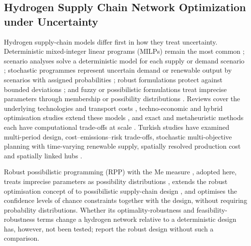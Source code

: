 \documentclass[preprint,12pt,authoryear]{elsarticle}
\begin{document}
\subsection{Hydrogen Supply Chain Network Optimization under Uncertainty}
Hydrogen supply-chain models differ first in how they treat uncertainty. Deterministic mixed-integer linear programs (MILPs) remain the most common \citep{camelo2025milp,yu2025optimization,dergunova2024great}; scenario analyses solve a deterministic model for each supply or demand scenario \citep{ma2025modeling}; stochastic programmes represent uncertain demand or renewable output by scenarios with assigned probabilities \citep{zhou2026collaborative,ozbek2025multi,turkaliozbek2025leveraging}; robust formulations protect against bounded deviations \citep{shao2026robust}; and fuzzy or possibilistic formulations treat imprecise parameters through membership or possibility distributions \citep{ochoarobles2020optimization,fazlikhalaf2020design}. Reviews cover the underlying technologies and transport costs \citep{monteiro2023hydrogen,solomon2024cost}, techno-economic and hybrid optimisation studies extend these models \citep{kim2024techno,park2024optimizing}, and exact and metaheuristic methods each have computational trade-offs at scale \citep{gorji2023challenges}. Turkish studies have examined multi-period design, cost--emissions--risk trade-offs, stochastic multi-objective planning with time-varying renewable supply, spatially resolved production cost and spatially linked hubs \citep{guler2021design,erdogan2023optimization,ozbek2025multi,turkaliozbek2025leveraging,guven2025spatial,gezen2026spatial}.

Robust possibilistic programming (RPP) \citep{pishvaee2012robust} with the Me measure \citep{xu2013approximation}, adopted here, treats imprecise parameters as possibility distributions \citep{dubois1988possibility,inuiguchi2000possibilistic}, extends the robust optimisation concept of \citet{mulvey1995robust} to possibilistic supply-chain design \citep{pishvaee2010possibilistic,bairamzadeh2016multi}, and optimises the confidence levels of chance constraints together with the design, without requiring probability distributions. Whether its optimality-robustness and feasibility-robustness terms change a hydrogen network relative to a deterministic design has, however, not been tested; \citet{fazlikhalaf2020design} report the robust design without such a comparison.
\end{document}
